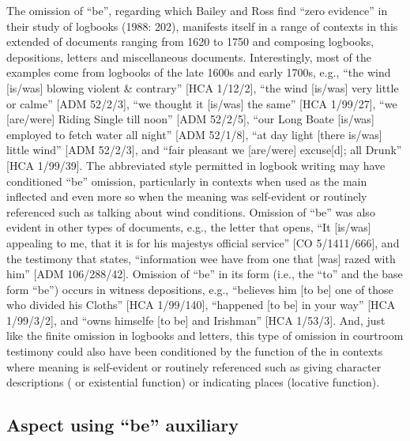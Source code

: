 The omission of “be”, regarding which Bailey and Ross find “zero evidence” in their study of  logbooks (1988: 202), manifests itself in a range of contexts in this extended  of documents ranging from 1620 to 1750 and composing logbooks, depositions, letters and miscellaneous documents. Interestingly, most of the examples come from logbooks of the late 1600s and early 1700s, e.g., “the wind [is/was] blowing violent \& contrary” [HCA 1/12/2], “the wind [is/was] very little or calme” [ADM 52/2/3], “we thought it [is/was] the same” [HCA 1/99/27], “we [are/were] Riding Single till noon” [ADM 52/2/5], “our Long Boate [is/was] employed to fetch water all night” [ADM 52/1/8], “at day light [there is/was] little wind” [ADM 52/2/3], and “fair pleasant we [are/were] excuse[d]; all Drunk” [HCA 1/99/39]. The abbreviated style permitted in logbook writing may have conditioned “be” omission, particularly in  contexts when used as the main inflected  and even more so when the meaning was self-evident or routinely referenced such as talking about wind conditions.  Omission of “be” was also evident in other types of documents, e.g., the letter that opens, “It [is/was] appealing to me, that it is for his majestys official service” [CO 5/1411/666], and the testimony that states, “information wee have from one that [was] razed with him” [ADM 106/288/42]. Omission of “be” in its  form (i.e., the  “to” and the base form “be”) occurs in witness depositions, e.g., “believes him [to be] one of those who divided his Cloths” [HCA 1/99/140], “happened [to be] in your way” [HCA 1/99/3/2], and “owns himselfe [to be] and Irishman” [HCA 1/53/3]. And, just like the finite omission in logbooks and letters, this type of  omission in courtroom testimony could also have been conditioned by the function of the  in contexts where meaning is self-evident or routinely referenced such as giving character descriptions ( or existential  function) or indicating places (locative function).

\subsection{{Aspect using “be” auxiliary}}\label{sec:6.3.3}

